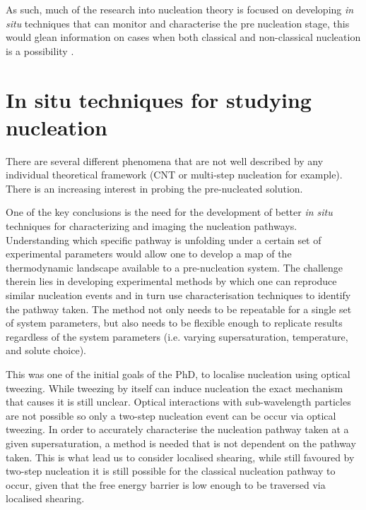 As such, much of the research into nucleation theory is 
focused on developing \textit{in situ} techniques that can 
monitor and characterise the pre nucleation stage, this
would glean information on cases when both classical 
and non-classical nucleation is a possibility 
\cite{Karthika2016}. 

\section{In situ techniques for studying nucleation}
There are several different phenomena \cite{Fu2021, Karthika2016} 
that are not well described by any individual theoretical framework 
(CNT or multi-step nucleation for example). There is an increasing 
interest in probing the pre-nucleated solution.

One of the key conclusions is the need for the development of 
better \textit{in situ} techniques for characterizing and 
imaging the nucleation pathways. Understanding which specific 
pathway is unfolding under a certain set of experimental 
parameters would allow one to develop a map of the thermodynamic 
landscape available to a pre-nucleation system. The challenge 
therein lies in developing experimental methods by which one can 
reproduce similar nucleation events and in turn use 
characterisation techniques to identify the pathway taken. The 
method not only needs to be repeatable for a single set of system 
parameters, but also needs to be flexible enough to replicate 
results regardless of the system parameters (i.e. varying 
supersaturation, temperature, and solute choice). 

This was one of the initial goals of the PhD, to localise nucleation
using optical tweezing. While tweezing by itself can induce nucleation
the exact mechanism that causes it is still unclear. Optical interactions
with sub-wavelength particles are not possible so only a two-step 
nucleation event can be occur via optical tweezing. In order to accurately 
characterise the nucleation pathway taken at a given supersaturation, 
a method is needed that is not dependent on the pathway taken. This is 
what lead us to consider localised shearing, while still favoured by 
two-step nucleation it is still possible for the classical nucleation 
pathway to occur, given that the free energy barrier is low enough to 
be traversed via localised shearing.  
